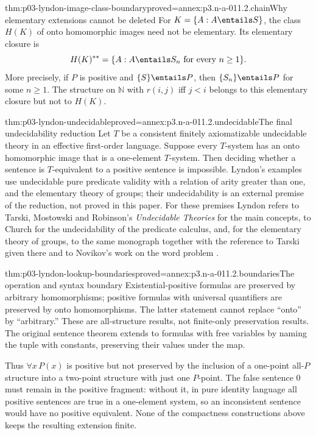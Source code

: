 \begin{hbtheorem}{thm:p03-lyndon-image-class-boundary}{proved=annex:p3.n-a-011.2.chain}{Why elementary extensions cannot be deleted}
For \(K=\{A:A\entails S\}\), the class \(H(K)\) of onto homomorphic
images need not be elementary. Its elementary closure is
\[
 H(K)^{**}=\{A:A\entails S_n\text{ for every }n\geq1\}.
\]
More precisely, if \(P\) is positive and \(\{S\}\entails P\),
then \(\{S_n\}\entails P\) for some \(n\geq1\).
The structure on \(\mathbb N\) with \(r(i,j)\) iff \(j<i\)
belongs to this elementary closure but not to \(H(K)\).
\end{hbtheorem}

\begin{hbtheorem}{thm:p03-lyndon-undecidable}{proved=annex:p3.n-a-011.2.undecidable}{The final undecidability reduction}
Let \(T\) be a consistent finitely axiomatizable undecidable theory in
an effective first-order language. Suppose every \(T\)-system has an
onto homomorphic image that is a one-element \(T\)-system. Then deciding
whether a sentence is \(T\)-equivalent to a positive sentence is impossible.
Lyndon's examples use undecidable pure predicate validity with a relation
of arity greater than one, and the elementary theory of groups; their
undecidability is an external premise of the reduction, not proved in this
paper. For these premises Lyndon refers to Tarski, Mostowski and Robinson's
\emph{Undecidable Theories} for the main concepts, to Church for the
undecidability of the predicate calculus, and, for the elementary theory of
groups, to the same monograph together with the reference to Tarski given
there and to Novikov's work on the word problem
\cite[p.~153, nn.~5--7]{Lyndon1959}.
\end{hbtheorem}

\begin{hbtheorem}{thm:p03-lyndon-lookup-boundaries}{proved=annex:p3.n-a-011.2.boundaries}{The operation and syntax boundary}
Existential-positive formulas are preserved by arbitrary homomorphisms;
positive formulas with universal quantifiers are preserved by onto
homomorphisms. The latter statement cannot replace ``onto'' by
``arbitrary.'' These are all-structure results, not finite-only preservation
results. The original sentence theorem extends to formulas with free
variables by naming the tuple with constants, preserving their values under
the map.
\end{hbtheorem}

Thus \(\forall x\,P(x)\) is positive but not preserved by the inclusion
of a one-point all-\(P\) structure into a two-point structure with just
one \(P\)-point. The false sentence \(0\) must remain in the positive
fragment: without it, in pure identity language all positive sentences
are true in a one-element system, so an inconsistent sentence would have
no positive equivalent. None of the compactness constructions above keeps
the resulting extension finite.
